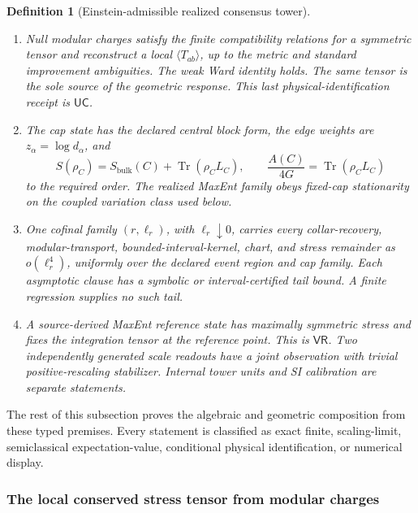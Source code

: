 \documentclass[11pt]{article}
\newtheorem{definition}[theorem]{Definition}
\begin{document}
\begin{definition}[Einstein-admissible realized consensus tower]
\begin{enumerate}[leftmargin=2em,label=\textup{EB\arabic*.}]
separation, rank-four affine-chart, overlap-cocycle, held-out quadratic-cone,
and causal-reachability receipts \(\mathsf{(E1)}\)--\(\mathsf{(E6)}\), together
with the \(\mathsf{MI}\)/assembly premise. Their charts form a connected
Lorentzian four-manifold with the declared regularity, stable causality,
record-Cauchy refinement, and source-derived conformal scale.
\item Null modular charges satisfy the finite compatibility relations for a
symmetric tensor and reconstruct a local \(\langle T_{ab}\rangle\), up to the
metric and standard improvement ambiguities. The weak Ward identity holds.
The same tensor is the sole source of the geometric response. This last
physical-identification receipt is \(\mathsf{UC}\).
\item The cap state has the declared central block form, the edge weights are
\(z_\alpha=\log d_\alpha\), and
\[
S(\rho_C)=S_{\mathrm{bulk}}(C)+\operatorname{Tr}(\rho_C L_C),
\qquad
\frac{A(C)}{4G}=\operatorname{Tr}(\rho_C L_C)
\]
to the required order. The realized MaxEnt family obeys fixed-cap
stationarity on the coupled variation class used below.
\item One cofinal family \((r,\ell_r)\), with \(\ell_r\downarrow0\), carries
every collar-recovery, modular-transport, bounded-interval-kernel, chart, and
stress remainder as \(o(\ell_r^4)\), uniformly over the declared event region
and cap family. Each asymptotic clause has a symbolic or interval-certified
tail bound. A finite regression supplies no such tail.
\item A source-derived MaxEnt reference state has maximally symmetric stress
and fixes the integration tensor at the reference point. This is
\(\mathsf{VR}\). Two independently generated scale readouts have a joint
observation with trivial positive-rescaling stabilizer. Internal tower units
and SI calibration are separate statements.
\end{enumerate}
\end{definition}

The rest of this subsection proves the algebraic and geometric composition
from these typed premises. Every statement is classified as exact finite,
scaling-limit, semiclassical expectation-value, conditional physical
identification, or numerical display.

\subsubsection{The local conserved stress tensor from modular charges}
\label{subsubsec:local-stress-from-modular-charges}
\end{document}
